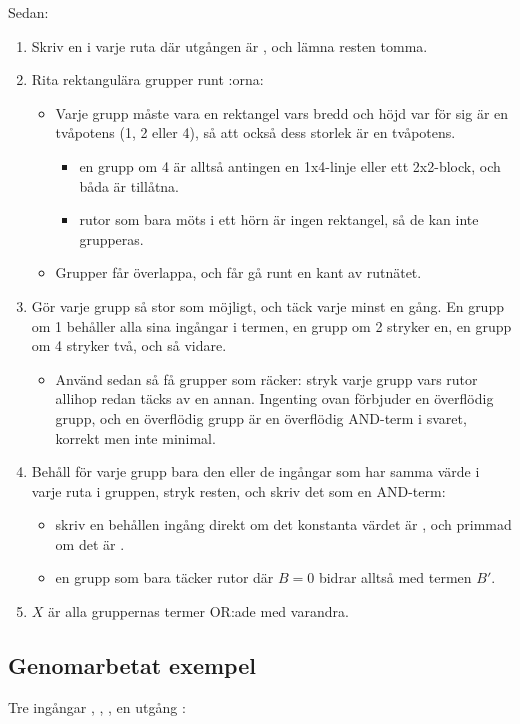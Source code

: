 Sedan:
\begin{enumerate}
  \item Skriv en  i varje ruta där utgången är , och lämna resten tomma.
  \item Rita rektangulära grupper runt :orna:
  \begin{itemize}
    \item Varje grupp måste vara en rektangel vars bredd och höjd var för sig är en tvåpotens
      (1, 2 eller 4), så att också dess storlek är en tvåpotens.
    \begin{itemize}
      \item en grupp om 4 är alltså antingen en 1x4-linje eller ett 2x2-block, och båda är
        tillåtna.
      \item rutor som bara möts i ett hörn är ingen rektangel, så de kan inte grupperas.
    \end{itemize}
    \item Grupper får överlappa, och får gå runt en kant av rutnätet.
  \end{itemize}
  \item Gör varje grupp så stor som möjligt, och täck varje  minst en gång. En grupp om 1
    behåller alla sina ingångar i termen, en grupp om 2 stryker en, en grupp om 4 stryker två, och
    så vidare.
  \begin{itemize}
    \item Använd sedan så få grupper som räcker: stryk varje grupp vars rutor allihop redan täcks
      av en annan. Ingenting ovan förbjuder en överflödig grupp, och en överflödig grupp är en
      överflödig AND-term i svaret, korrekt men inte minimal.
  \end{itemize}
  \item Behåll för varje grupp bara den eller de ingångar som har samma värde i varje ruta i
    gruppen, stryk resten, och skriv det som en AND-term:
  \begin{itemize}
    \item skriv en behållen ingång direkt om det konstanta värdet är , och primmad om det
      är .
    \item en grupp som bara täcker rutor där $B = 0$ bidrar alltså med termen $B'$.
  \end{itemize}
  \item $X$ är alla gruppernas termer OR:ade med varandra.
\end{enumerate}

\subsection*{Genomarbetat exempel}
Tre ingångar , , , en utgång :

